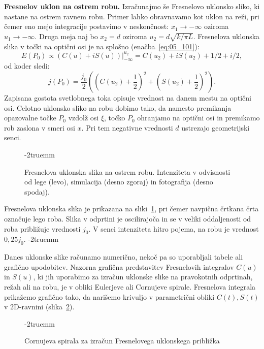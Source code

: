 \begin{example}{\bf Fresnelov uklon na ostrem robu.}
Izračunajmo še Fresnelovo uklonsko sliko, ki nastane na ostrem ravnem robu. Primer
lahko obravnavamo kot uklon na reži, pri čemer eno mejo integracije postavimo v neskončnost:
$x_1 \to -\infty$ oziroma $u_1 \to -\infty$. Druga meja naj bo $x_2 = d$ oziroma 
$u_2  = d\sqrt{k/\pi L}$. Fresnelova uklonska slika v točki na optični osi 
je na splošno (enačba~\ref{eq:05_101}):
\begin{equation}
\left. E(P_0) \propto \left( C(u) + iS(u) \right) \right|_{-\infty}^{u_2} = 
C(u_2) + i S(u_2) + 1/2 + i/2,
\label{eq:05_102}
\end{equation}
od koder sledi:
\begin{equation}
j(P_0)  = \frac{j_0}{2}\left(\!\!\left(C(u_2) + \frac{1}{2}\right)^2 + \left(S(u_2) + \frac{1}{2}\right)^2\right)\!\!.
\label{eq:05_103}
\end{equation}
Zapisana gostota svetlobnega toka opisuje vrednost na danem mestu na optični osi. 
Celotno uklonsko sliko na robu dobimo tako, da namesto premikanja opazovalne točke $P_0$ vzdolž osi 
$\xi$, točko $P_0$ ohranjamo na optični osi in premikamo rob zaslona 
v smeri osi $x$. Pri tem negativne vrednosti $d$ ustrezajo geometrijski senci. 
\begin{figure}[ht]
\centering
\def\svgwidth{140truemm} 

\caption{Fresnelova uklonska slika na ostrem robu. Intenziteta v odvisnosti od lege (levo),
simulacija (desno zgoraj) in fotografija (desno spodaj).}
\label{fig:05_FresRob}
\vglue-2truemm
\end{figure}

Fresnelova uklonska slika je prikazana na sliki~\ref{fig:05_FresRob}, pri čemer navpična
črtkana črta označuje lego roba. Slika v odprtini je oscilirajoča in se v veliki oddaljenosti
od roba približuje vrednosti $j_0$. V senci intenziteta hitro pojema, na robu je vrednost
$0,25 j_0$.  
\vglue-2truemm
\begin{remark}
Danes uklonske slike računamo numerično, nekoč pa so uporabljali tabele ali 
grafično upodobitev. Nazorna grafična predstavitev Fresnelovih 
integralov $C(u)$ in $S(u)$, ki jih uporabimo za izračun uklonske slike 
na pravokotnih odprtinah, režah ali na robu, je v obliki Eulerjeve ali Cornujeve 
spirale. 
Fresnelova integrala prikažemo grafično tako, da narišemo
krivuljo v parametrični obliki $C(t), S(t)$ v 2D-ravnini (slika~\ref{fig:05_Cornu}). 
\begin{figure}[ht]
\centering
\def\svgwidth{80truemm} 

\caption{Cornujeva spirala za izračun Fresnelovega uklonskega približka}
\label{fig:05_Cornu}
\vglue-2truemm
\end{figure}


\end{remark}
\end{example}
